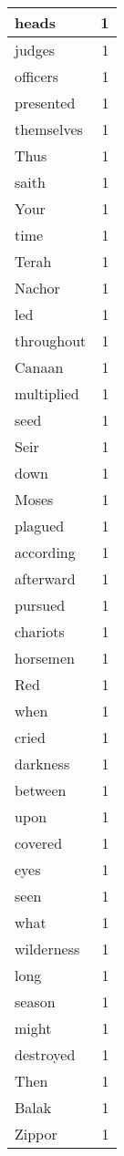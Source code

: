 \begin{center}
\begin{longtable}{l|r}
heads & 1\\ \hline 
judges & 1\\ \hline 
officers & 1\\ \hline 
presented & 1\\ \hline 
themselves & 1\\ \hline 
Thus & 1\\ \hline 
saith & 1\\ \hline 
Your & 1\\ \hline 
time & 1\\ \hline 
Terah & 1\\ \hline 
Nachor & 1\\ \hline 
led & 1\\ \hline 
throughout & 1\\ \hline 
Canaan & 1\\ \hline 
multiplied & 1\\ \hline 
seed & 1\\ \hline 
Seir & 1\\ \hline 
down & 1\\ \hline 
Moses & 1\\ \hline 
plagued & 1\\ \hline 
according & 1\\ \hline 
afterward & 1\\ \hline 
pursued & 1\\ \hline 
chariots & 1\\ \hline 
horsemen & 1\\ \hline 
Red & 1\\ \hline 
when & 1\\ \hline 
cried & 1\\ \hline 
darkness & 1\\ \hline 
between & 1\\ \hline 
upon & 1\\ \hline 
covered & 1\\ \hline 
eyes & 1\\ \hline 
seen & 1\\ \hline 
what & 1\\ \hline 
wilderness & 1\\ \hline 
long & 1\\ \hline 
season & 1\\ \hline 
might & 1\\ \hline 
destroyed & 1\\ \hline 
Then & 1\\ \hline 
Balak & 1\\ \hline 
Zippor & 1\\ \hline 

\end{longtable}
\end{center}
